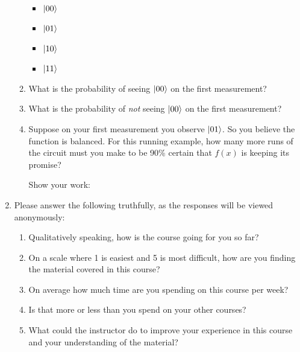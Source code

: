 \documentclass[12pt]{article}
\begin{document}
\begin{enumerate}[font=\bfseries]
\begin{enumerate}[label=\theenumi.\arabic*]
        \begin{itemize}
            \item $\ket{00}$\Blank{}
             \item $\ket{01}$\Blank{}
              \item $\ket{10}$\Blank{}
               \item $\ket{11}$\Blank{}
        \end{itemize}
        \item What is the probability of seeing $\ket{00}$ on the first measurement?\Blank{}
        \item What is the probability of \emph{not} seeing $\ket{00}$ on the first measurement?\Blank{}
        \item Suppose on your first measurement you observe $\ket{01}$.  So you believe the function is balanced.  For this running example, how many more runs of the circuit must you make to be 90\% certain that $f(x)$ is keeping its promise? \Blank{}
        
        Show your work:
        \LeaveSpace{}
    \end{enumerate}
    \item {} Please answer the following truthfully, as the responses will be viewed anonymously:
    \begin{enumerate}[label=\theenumi.\arabic*]
        \item Qualitatively speaking, how is the course going for you so far? \LeaveSpace{}
        \item On a scale where 1 is easiest and 5 is most difficult, how are you finding the material covered in this course?\Blank{}
        \item On average how much time are you spending on this course per week?\Blank{}
        \item Is that more or less than you spend on your other courses?\Blank{}
        \item What could the instructor do to improve your experience in this course and your understanding of the material?
        \LeaveSpace{}
    \end{enumerate}

\end{enumerate}
\end{document}
